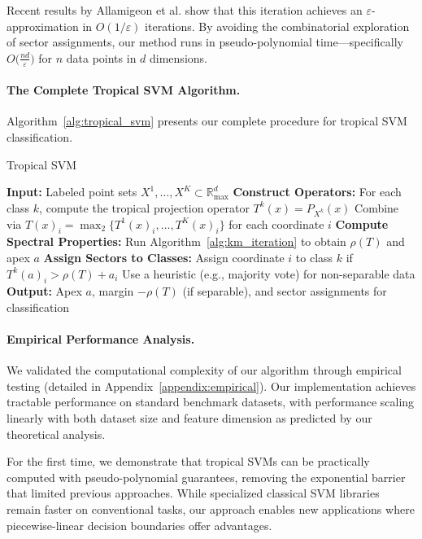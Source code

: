 \documentclass{article}
\newcommand{\Rmax}{\mathbb{R}_{\max}}
\begin{document}
Recent results by Allamigeon et al. \cite{allamigeon2025} show that this iteration achieves an $\varepsilon$-approximation in $O(1/\varepsilon)$ iterations. By avoiding the combinatorial exploration of sector assignments, our method runs in pseudo-polynomial time—specifically $O\bigl(\frac{nd}{\varepsilon}\bigr)$ for $n$ data points in $d$ dimensions.

\paragraph{The Complete Tropical SVM Algorithm.}\label{subsec:complete_algorithm}
Algorithm~\ref{alg:tropical_svm} presents our complete procedure for tropical SVM classification.

\begin{algorithm}
\caption{Tropical SVM}\label{alg:tropical_svm}
\begin{algorithmic}[1]
\STATE \textbf{Input:} Labeled point sets $X^1,\dots,X^K \subset \Rmax^d$
\STATE \textbf{Construct Operators:}
  \STATE \quad For each class $k$, compute the tropical projection operator $T^k(x) = P_{X^k}(x)$
  \STATE \quad Combine via $T(x)_i = \operatorname{\max}_2\{T^1(x)_i, \dots, T^K(x)_i\}$ for each coordinate $i$
\STATE \textbf{Compute Spectral Properties:}
  \STATE \quad Run Algorithm~\ref{alg:km_iteration} to obtain $\rho(T)$ and apex $a$
\STATE \textbf{Assign Sectors to Classes:}
    \STATE Assign coordinate $i$ to class $k$ if $T^k(a)_i > \rho(T) + a_i$ 
  \ELSE
    \STATE Use a heuristic (e.g., majority vote) for non-separable data 
  \ENDIF
\STATE \textbf{Output:} Apex $a$, margin $-\rho(T)$ (if separable), and sector assignments for classification
\end{algorithmic}
\end{algorithm}

\paragraph{Empirical Performance Analysis.}
We validated the computational complexity of our algorithm through empirical testing (detailed in Appendix~\ref{appendix:empirical}). Our implementation achieves tractable performance on standard benchmark datasets, with performance scaling linearly with both dataset size and feature dimension as predicted by our theoretical analysis.

For the first time, we demonstrate that tropical SVMs can be practically computed with pseudo-polynomial guarantees, removing the exponential barrier that limited previous approaches. While specialized classical SVM libraries remain faster on conventional tasks, our approach enables new applications where piecewise-linear decision boundaries offer advantages.
\end{document}
